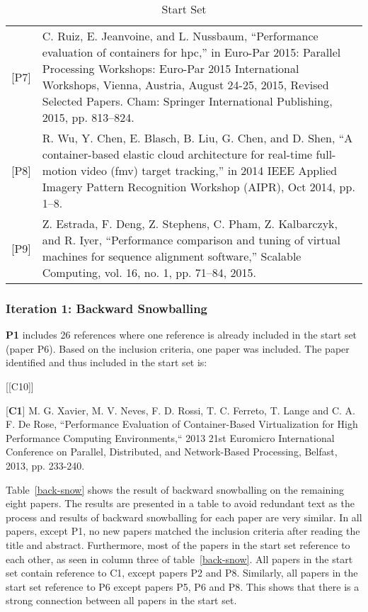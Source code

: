 \begin{table}[]
\begin{tabular}{lp{13cm}}
{[}P7{]}  & C. Ruiz, E. Jeanvoine, and L. Nussbaum, “Performance evaluation of containers for hpc,” in Euro-Par 2015: Parallel Processing Workshops: Euro-Par 2015 International Workshops, Vienna, Austria, August 24-25, 2015, Revised Selected Papers. Cham: Springer International Publishing, 2015, pp. 813–824. \\
{[}P8{]}  & R. Wu, Y. Chen, E. Blasch, B. Liu, G. Chen, and D. Shen, “A container-based elastic cloud architecture for real-time full-motion video (fmv) target tracking,” in 2014 IEEE Applied Imagery Pattern Recognition Workshop (AIPR), Oct 2014, pp. 1–8.                                                                                  \\
{[}P9{]} & Z. Estrada, F. Deng, Z. Stephens, C. Pham, Z. Kalbarczyk, and R. Iyer, “Performance comparison and tuning of virtual machines for sequence alignment software,” Scalable Computing, vol. 16, no. 1, pp. 71–84, 2015.
\end{tabular}
\centering
\caption{Start Set}
\label{lr-startset}
\end{table}
\subsubsection*{Iteration 1: Backward Snowballing}
\textbf{P1} includes 26 references where one reference is already included in the start set (paper P6). Based on the inclusion criteria, one paper was included. The paper identified and thus included in the start set is: \\

\begin{labeling}{[{[}C10{]}]}
\item [{[}\textbf{C1}{]}]  M. G. Xavier, M. V. Neves, F. D. Rossi, T. C. Ferreto, T. Lange and C. A. F. De Rose, “Performance Evaluation of Container-Based Virtualization for High Performance Computing Environments,“ 2013 21st Euromicro International Conference on Parallel, Distributed, and Network-Based Processing, Belfast, 2013, pp. 233-240.
\item
\end{labeling}

Table~\ref{back-snow} shows the result of backward snowballing on the remaining eight papers. The results are presented in a table to avoid redundant text as the process and results of backward snowballing for each paper are very similar. In all papers, except P1, no new papers matched the inclusion criteria after reading the title and abstract. Furthermore, most of the papers in the start set reference to each other, as seen in column three of table~\ref{back-snow}. All papers in the start set contain reference to C1, except papers P2 and P8. Similarly, all papers in the start set reference to P6 except papers P5, P6 and P8. This shows that there is a strong connection between all papers in the start set. 

